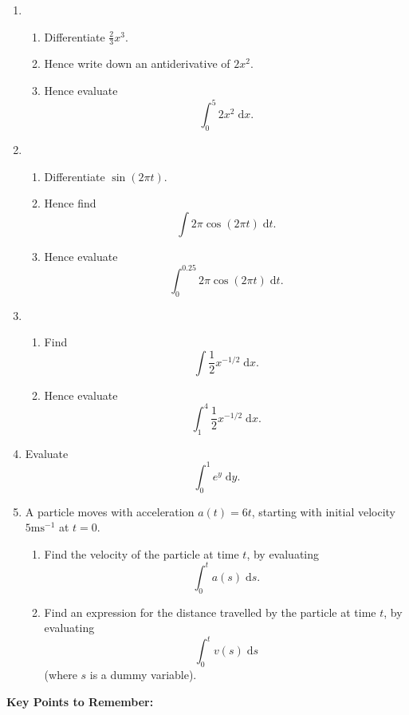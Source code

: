 \documentclass{article}
\newcommand{\diff}{\;\mathrm{d}}
\begin{document}
\begin{enumerate}
	\item 
		\begin{enumerate}
			\item Differentiate $\frac{2}{3}x^3$.
			\item Hence write down an antiderivative of $2x^2$.
			\item Hence evaluate
				\[\int_0^5 2x^2\diff x.\]
		\end{enumerate}
	\item
		\begin{enumerate}
			\item Differentiate $\sin(2\pi t)$.
			\item Hence find
				\[\int 2\pi \cos(2\pi t)\diff t.\]
			\item Hence evaluate
				\[\int_0^{0.25} 2\pi \cos(2\pi t)\diff t.\]
		\end{enumerate}
	\item
		\begin{enumerate}
			\item Find
				\[\int \frac{1}{2}x^{-1/2}\diff x.\]
			\item Hence evaluate
				\[\int_1^4 \frac{1}{2}x^{-1/2}\diff x.\]
		\end{enumerate}
	\item Evaluate
		\[\int_0^1 e^y \diff y.\]
	\item A particle moves with acceleration $a(t)=6t$, starting with initial velocity $5\mathrm{ms}^{-1}$ at $t=0$.
		\begin{enumerate}
			\item Find the velocity of the particle at time $t$, by evaluating
				\[\int_0^t a(s)\diff s.\]
			\item Find an expression for the distance travelled by the particle at time $t$, by evaluating
				\[\int_0^t v(s)\diff s\]
				(where $s$ is a dummy variable).
		\end{enumerate}
\end{enumerate}








\clearpage













{\bf Key Points to Remember:}
\end{document}

